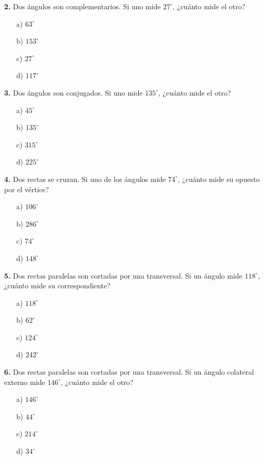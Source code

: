 \noindent\textbf{2.} Dos ángulos son complementarios. Si uno mide $27^\circ$, ¿cuánto mide el otro?

\begin{itemize}
    \item[a)] $63^\circ$
    \item[b)] $153^\circ$
    \item[c)] $27^\circ$
    \item[d)] $117^\circ$
\end{itemize}


\noindent\textbf{3.} Dos ángulos son conjugados. Si uno mide $135^\circ$, ¿cuánto mide el otro?

\begin{itemize}
    \item[a)] $45^\circ$
    \item[b)] $135^\circ$
    \item[c)] $315^\circ$
    \item[d)] $225^\circ$
\end{itemize}


\noindent\textbf{4.} Dos rectas se cruzan. Si uno de los ángulos mide $74^\circ$, ¿cuánto mide su opuesto por el vértice?

\begin{itemize}
    \item[a)] $106^\circ$
    \item[b)] $286^\circ$
    \item[c)] $74^\circ$
    \item[d)] $148^\circ$
\end{itemize}


\noindent\textbf{5.} Dos rectas paralelas son cortadas por una transversal. Si un ángulo mide $118^\circ$, ¿cuánto mide su correspondiente?

\begin{itemize}
    \item[a)] $118^\circ$
    \item[b)] $62^\circ$
    \item[c)] $124^\circ$
    \item[d)] $242^\circ$
\end{itemize}


\noindent\textbf{6.} Dos rectas paralelas son cortadas por una transversal. Si un ángulo colateral externo mide $146^\circ$, ¿cuánto mide el otro?

\begin{itemize}
    \item[a)] $146^\circ$
    \item[b)] $44^\circ$
    \item[c)] $214^\circ$
    \item[d)] $34^\circ$
\end{itemize}



